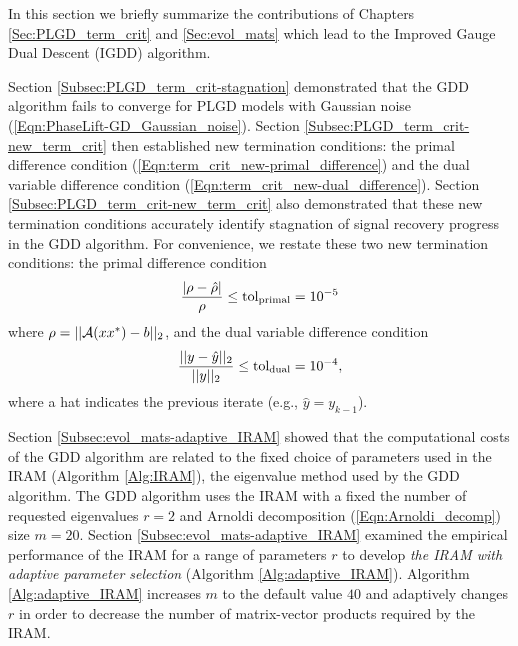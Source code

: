 In this section we briefly summarize the contributions of Chapters \ref{Sec:PLGD_term_crit} and \ref{Sec:evol_mats} which lead to the Improved Gauge Dual Descent (IGDD) algorithm.

Section \ref{Subsec:PLGD_term_crit-stagnation} demonstrated that the GDD algorithm fails to converge for PLGD models with Gaussian noise (\ref{Eqn:PhaseLift-GD_Gaussian_noise}).
Section \ref{Subsec:PLGD_term_crit-new_term_crit} then established new termination conditions: the primal difference condition (\ref{Eqn:term_crit_new-primal_difference}) and the dual variable difference condition (\ref{Eqn:term_crit_new-dual_difference}).
Section \ref{Subsec:PLGD_term_crit-new_term_crit} also demonstrated that these new termination conditions accurately identify stagnation of signal recovery progress in the GDD algorithm.
For convenience, we restate these two new termination conditions:
the primal difference condition
\begin{equation}
	\label{Eqn:term_crit_new-primal_difference2}
\frac{| \rho - \hat{\rho} |}{\rho} \leq  \textnormal{tol}_\textnormal{primal} = 10^{-5}
\end{equation}
where $\rho = ||{\mathcal A}(xx^*) - b||_2$,
and the dual variable difference condition
\begin{equation}
	\label{Eqn:term_crit_new-dual_difference2}
\frac{||y- \hat{y}||_2}{||y||_2} \leq \textnormal{tol}_\textnormal{dual}= 10^{-4},
\end{equation}
where a hat indicates the previous iterate (e.g., $\hat{y} = y_{k-1}$). 


Section \ref{Subsec:evol_mats-adaptive_IRAM} showed that the computational costs of the GDD algorithm are related to the fixed choice of parameters used in the IRAM (Algorithm \ref{Alg:IRAM}), the eigenvalue method used by the GDD algorithm.
The GDD algorithm uses the IRAM with a fixed the number of requested eigenvalues $r = 2$ and Arnoldi decomposition (\ref{Eqn:Arnoldi_decomp}) size $m = 20$.
Section \ref{Subsec:evol_mats-adaptive_IRAM} examined the empirical performance of the IRAM for a range of parameters $r$ to develop \textit{the IRAM with adaptive parameter selection} (Algorithm \ref{Alg:adaptive_IRAM}).
Algorithm \ref{Alg:adaptive_IRAM} increases $m$ to the default value $40$ and adaptively changes $r$ in order to decrease the number of matrix-vector products required by the IRAM.



